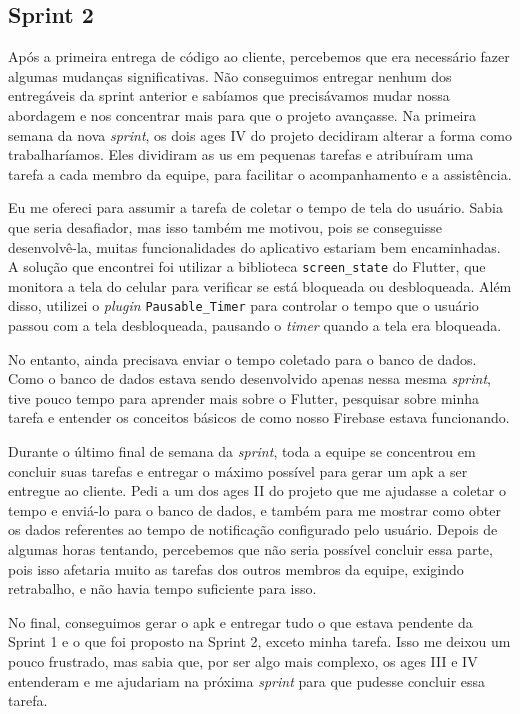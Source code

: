 \subsection{Sprint 2}

Após a primeira entrega de código ao cliente, percebemos que era necessário fazer algumas mudanças significativas. Não conseguimos entregar nenhum dos entregáveis da sprint anterior e sabíamos que precisávamos mudar nossa abordagem e nos concentrar mais para que o projeto avançasse. Na primeira semana da nova \textit{sprint}, os dois \ac{ages} IV do projeto decidiram alterar a forma como trabalharíamos. Eles dividiram as \ac{us} em pequenas tarefas e atribuíram uma tarefa a cada membro da equipe, para facilitar o acompanhamento e a assistência.

Eu me ofereci para assumir a tarefa de coletar o tempo de tela do usuário. Sabia que seria desafiador, mas isso também me motivou, pois se conseguisse desenvolvê-la, muitas funcionalidades do aplicativo estariam bem encaminhadas. A solução que encontrei foi utilizar a biblioteca \texttt{screen\_state} do Flutter, que monitora a tela do celular para verificar se está bloqueada ou desbloqueada. Além disso, utilizei o \textit{plugin} \texttt{Pausable\_Timer} para controlar o tempo que o usuário passou com a tela desbloqueada, pausando o \textit{timer} quando a tela era bloqueada.

No entanto, ainda precisava enviar o tempo coletado para o banco de dados. Como o banco de dados estava sendo desenvolvido apenas nessa mesma \textit{sprint}, tive pouco tempo para aprender mais sobre o Flutter, pesquisar sobre minha tarefa e entender os conceitos básicos de como nosso Firebase estava funcionando.

Durante o último final de semana da \textit{sprint}, toda a equipe se concentrou em concluir suas tarefas e entregar o máximo possível para gerar um \ac{apk} a ser entregue ao cliente. Pedi a um dos \ac{ages} II do projeto que me ajudasse a coletar o tempo e enviá-lo para o banco de dados, e também para me mostrar como obter os dados referentes ao tempo de notificação configurado pelo usuário. Depois de algumas horas tentando, percebemos que não seria possível concluir essa parte, pois isso afetaria muito as tarefas dos outros membros da equipe, exigindo retrabalho, e não havia tempo suficiente para isso.

No final, conseguimos gerar o \ac{apk} e entregar tudo o que estava pendente da Sprint 1 e o que foi proposto na Sprint 2, exceto minha tarefa. Isso me deixou um pouco frustrado, mas sabia que, por ser algo mais complexo, os \ac{ages} III e IV entenderam e me ajudariam na próxima \textit{sprint} para que pudesse concluir essa tarefa.
